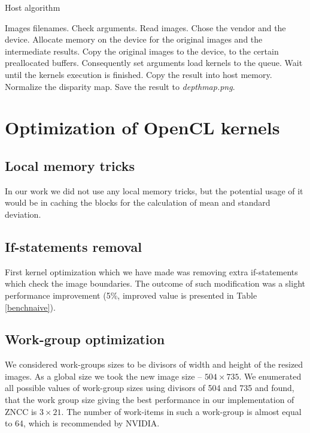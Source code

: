 \documentclass[conference]{IEEEtran}
\begin{document}
 \begin{algorithm}
 \caption{Host algorithm}\label{hostcode}
 \begin{algorithmic}[1]
 \renewcommand{\algorithmicrequire}{\textbf{Input:}}
 \renewcommand{\algorithmicensure}{\textbf{Output:}}
 \REQUIRE Images filenames.
  \STATE Check arguments.
  \STATE Read images.
  \STATE Chose the vendor and the device.
  \STATE Allocate memory on the device for the original images and the intermediate results.
  \STATE Copy the original images to the device, to the certain preallocated buffers.
  \STATE Consequently set arguments load kernels to the queue.
  \STATE Wait until the kernels execution is finished.
  \STATE Copy the result into host memory.
  \STATE Normalize the disparity map.
  \STATE Save the result to \textit{depthmap.png}.
 \end{algorithmic} 
 \end{algorithm}

\section{Optimization of OpenCL kernels}\label{sec:Optimization}
\subsection{Local memory tricks} 
In our work we did not use any local memory tricks, but the potential usage of it would be in caching the blocks for the calculation of mean and standard deviation.

\subsection{If-statements removal}
First kernel optimization which we have made was removing extra if-statements  which check the image boundaries. The outcome of such modification was a slight performance improvement (5\%, improved value is presented in Table \ref{benchnaive}).

\subsection{Work-group optimization}
We considered work-groups sizes to be divisors of width and height of the resized images. As a global size we took the new image size -- $504\times735$. We enumerated all possible values of work-group sizes using divisors of 504 and 735 and found, that the work group size giving the best performance in our implementation of ZNCC is $3\times21$. The number of work-items in such a work-group is almost equal to 64, which is recommended by NVIDIA.
\end{document}

